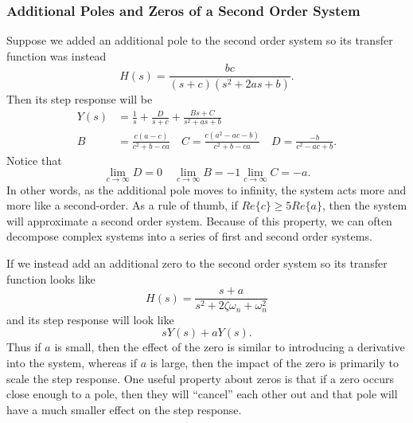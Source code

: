 \subsubsection{Additional Poles and Zeros of a Second Order System}
Suppose we added an additional pole to the second order system so its transfer function was instead
\[
  H(s) = \frac{bc}{(s+c)(s^2+2as+b)}.
\]
Then its step response will be
\begin{align*}
  Y(s) &= \frac{1}{s}+\frac{D}{s+c}+\frac{Bs+C}{s^2+as+b}\\
  B &= \frac{c(a-c)}{c^2+b-ca}\quad C = \frac{c(a^2-ac-b)}{c^2+b-ca} \quad D = \frac{-b}{c^2-ac+b}.
\end{align*}
Notice that
\[
  \lim_{c\to\infty} D = 0 \quad \lim_{c\to\infty} B = -1 \lim_{c\to\infty} C = -a.
\]
In other words, as the additional pole moves to infinity, the system acts more and more like a second-order. As a rule of thumb, if $Re\{c\}\geq5Re\{a\}$, then the system will approximate a second order system.
Because of this property, we can often decompose complex systems into a series of first and second order systems.

If we instead add an additional zero to the second order system so its transfer function looks like
\[
  H(s) = \frac{s+a}{s^2+2\zeta\omega_n+\omega_n^2}
\]
and its step response will look like
\[
  sY(s) + aY(s).
\]
Thus if $a$ is small, then the effect of the zero is similar to introducing a derivative into the system, whereas if $a$ is large, then the impact of the zero is primarily to scale the step response.
One useful property about zeros is that if a zero occurs close enough to a pole, then they will ``cancel'' each other out and that pole will have a much smaller effect on the step response.
